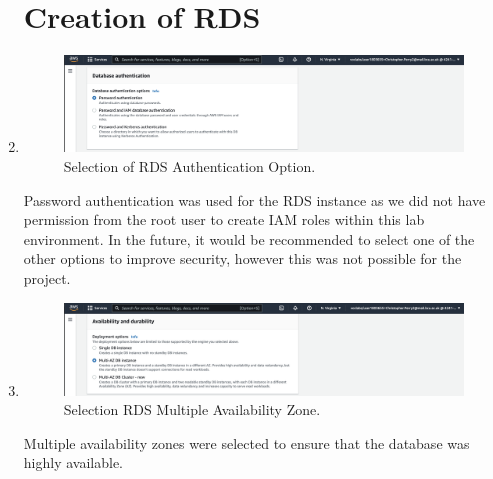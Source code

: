 \begin{enumerate}
    \section{Creation of RDS}\label{sec:creation-of-rds}

    \item
    \begin{figure}[H]
        \centering
        \includegraphics[width=\textwidth]{resources/rds/rds-authentication.png}
        \caption{Selection of RDS Authentication Option.}
        \label{fig:rds-auth}
    \end{figure}\nolinebreak
    Password authentication was used for the RDS instance as we did not have permission from the root user to create IAM
    roles within this lab environment.
    In the future, it would be recommended to select one of the other options to improve security, however this was not
    possible for the project.

    \item
    \begin{figure}[H]
        \centering
        \includegraphics[width=\textwidth]{resources/rds/rds-availability-durability}
        \caption{Selection RDS Multiple Availability Zone.}
        \label{fig:rds-avail}
    \end{figure}\nolinebreak
    Multiple availability zones were selected to ensure that the database was highly available.


\end{enumerate}
